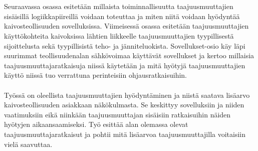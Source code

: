 \documentclass[finnish,12pt,a4paper,pdftex,elec,utf8]{aaltothesis}
\begin{document}
\\\\
Seuraavassa osassa esitetään millaista toiminnallisuutta taajuusmuuttajien sisäisillä logiikkapiireillä voidaan toteuttaa ja miten niitä voidaan hyödyntää kaivosteollisuuden sovelluksissa. Viimeisessä osassa esitetään taajuusmuuttajien käyttökohteita kaivoksissa lähtien liikkeelle taajuusmuuttajien tyypillisestä sijoittelusta sekä tyypillisistä teho- ja jänniteluokista. Sovellukset-osio käy läpi suurimmat teollisuudenalan sähkövoimaa käyttävät sovellukset ja kertoo millaisia taajuusmuuttajaratkaisuja niissä käytetään ja mitä hyötyjä taajuusmuuttajien käyttö niissä tuo verrattuna perinteisiin ohjausratkaisuihin.
\\\\
Työssä on oleellista taajuusmuuttajien hyödyntäminen ja niistä saatava lisäarvo kaivosteollisuuden asiakkaan näkökulmasta. Se keskittyy sovelluksiin ja niiden vaatimuksiin eikä niinkään taajuusmuuttajan sisäisiin ratkaisuihin näiden hyötyjen aikaansaamiseksi. Työ esittää alan olemassa olevat taajuusmuuttajaratkaisut ja pohtii mitä lisäarvoa taajuusmuuttajilla voitaisiin vielä saavuttaa.

\clearpage

\end{document}
